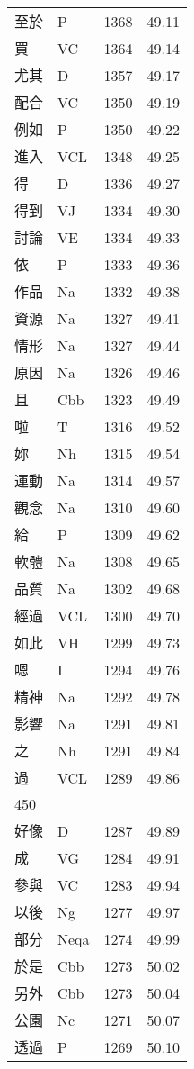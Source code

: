 \documentclass[twocolumn]{book}
\begin{document}
\begin{supertabular}{llrr}
至於 & P & 1368 &  49.11\\
買 & VC & 1364 &  49.14\\
尤其 & D & 1357 &  49.17\\
配合 & VC & 1350 &  49.19\\
例如 & P & 1350 &  49.22\\
進入 & VCL & 1348 &  49.25\\
得 & D & 1336 &  49.27\\
得到 & VJ & 1334 &  49.30\\
討論 & VE & 1334 &  49.33\\
依 & P & 1333 &  49.36\\
作品 & Na & 1332 &  49.38\\
資源 & Na & 1327 &  49.41\\
情形 & Na & 1327 &  49.44\\
原因 & Na & 1326 &  49.46\\
且 & Cbb & 1323 &  49.49\\
啦 & T & 1316 &  49.52\\
妳 & Nh & 1315 &  49.54\\
運動 & Na & 1314 &  49.57\\
觀念 & Na & 1310 &  49.60\\
給 & P & 1309 &  49.62\\
軟體 & Na & 1308 &  49.65\\
品質 & Na & 1302 &  49.68\\
經過 & VCL & 1300 &  49.70\\
如此 & VH & 1299 &  49.73\\
嗯 & I & 1294 &  49.76\\
精神 & Na & 1292 &  49.78\\
影響 & Na & 1291 &  49.81\\
之 & Nh & 1291 &  49.84\\
過 & VCL & 1289 &  49.86\\
450\\
好像 & D & 1287 &  49.89\\
成 & VG & 1284 &  49.91\\
參與 & VC & 1283 &  49.94\\
以後 & Ng & 1277 &  49.97\\
部分 & Neqa & 1274 &  49.99\\
於是 & Cbb & 1273 &  50.02\\
另外 & Cbb & 1273 &  50.04\\
公園 & Nc & 1271 &  50.07\\
透過 & P & 1269 &  50.10\\

\end{supertabular}
\end{document}
